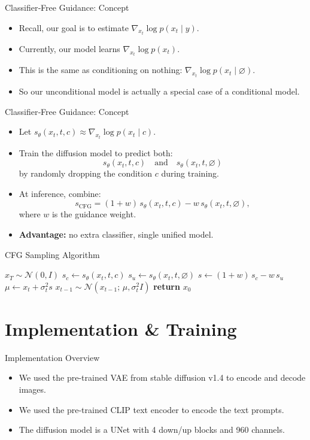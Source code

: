 \documentclass[11pt]{beamer}
\begin{document}
\begin{frame}{Classifier‐Free Guidance: Concept}
  \begin{itemize}
    \item Recall, our goal is to estimate $\nabla_{x_t}\log p(x_t\mid y)$.
    \item Currently, our model learns $\nabla_{x_t}\log p(x_t)$.
    \item This is the same as conditioning on nothing: $\nabla_{x_t}\log p(x_t\mid \varnothing)$.
    \item So our unconditional model is actually a special case of a conditional model.
  \end{itemize}
\end{frame}

\begin{frame}{Classifier‐Free Guidance: Concept}
  \begin{itemize}
    \item Let $s_\theta(x_t,t,c) \approx \nabla_{x_t}\log p(x_t\mid c)$.
    \item Train the diffusion model to predict both:
      \[
      s_\theta(x_t,t,c)
      \quad\text{and}\quad
      s_\theta(x_t,t,\varnothing)
      \]
      by randomly dropping the condition $c$ during training.
    \item At inference, combine:
      \[
      s_{\mathrm{CFG}}
      = (1+w)\,s_\theta(x_t,t,c)
      - w\,s_\theta(x_t,t,\varnothing),
      \]
      where $w$ is the guidance weight.
    \item \textbf{Advantage:} no extra classifier, single unified model.
    \end{itemize}
  \end{frame}

\begin{frame}[fragile]{CFG Sampling Algorithm}
  \begin{algorithmic}[1]
    \STATE $x_T \sim \mathcal{N}(0,I)$
      \STATE $s_c \gets s_\theta(x_t,t,c)$
      \STATE $s_u \gets s_\theta(x_t,t,\varnothing)$ 
      \STATE $s \gets (1+w)\,s_c - w\,s_u$ 
      \STATE $\mu \gets x_t + \sigma_t^2 s$
      \STATE $x_{t-1}\sim \mathcal{N}(x_{t-1};\,\mu,\sigma_t^2 I)$
    \ENDFOR
    \STATE \textbf{return} $x_0$
  \end{algorithmic}
\end{frame}

\section{Implementation \& Training}
\begin{frame}{Implementation Overview}
  \begin{itemize}
    \item We used the pre-trained VAE from stable diffusion v1.4 to encode and decode images.
    \item We used the pre-trained CLIP text encoder to encode the text prompts.
    \item The diffusion model is a UNet with 4 down/up blocks and 960 channels.
  \end{itemize}
\end{frame}
\end{document}
